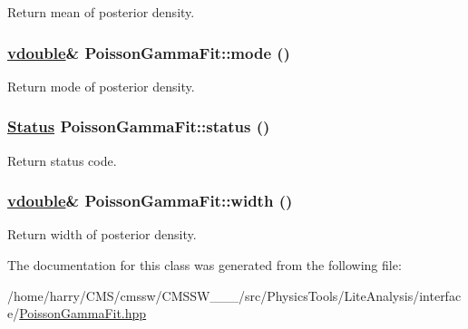 Return mean of posterior density. 

\hypertarget{classPoissonGammaFit_a5}{
\subsubsection[mode]{\setlength{\rightskip}{0pt plus 5cm}\hyperlink{PoissonGammaFit_8hpp_a0}{vdouble}\& Poisson\-Gamma\-Fit::mode ()}}
\label{classPoissonGammaFit_a5}


Return mode of posterior density. 

\hypertarget{classPoissonGammaFit_a4}{
\subsubsection[status]{\setlength{\rightskip}{0pt plus 5cm}\hyperlink{classPoissonGammaFit_w7}{Status} Poisson\-Gamma\-Fit::status ()}}
\label{classPoissonGammaFit_a4}


Return status code. 

\hypertarget{classPoissonGammaFit_a7}{
\subsubsection[width]{\setlength{\rightskip}{0pt plus 5cm}\hyperlink{PoissonGammaFit_8hpp_a0}{vdouble}\& Poisson\-Gamma\-Fit::width ()}}
\label{classPoissonGammaFit_a7}


Return width of posterior density. 



The documentation for this class was generated from the following file:\begin{CompactItemize}
\item 
/home/harry/CMS/cmssw/CMSSW\_\_\_/src/Physics\-Tools/Lite\-Analysis/interface/\hyperlink{PoissonGammaFit_8hpp}{Poisson\-Gamma\-Fit.hpp}\end{CompactItemize}
